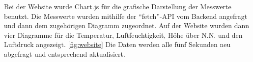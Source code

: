 Bei der Website wurde Chart.js für die grafische Darstellung der Messwerte benutzt.
Die Messwerte wurden mithilfe der "`fetch"'-API vom Backend angefragt und dann dem zugehörigen Diagramm zugeordnet.
Auf der Website wurden dann vier Diagramme für die Temperatur, Luftfeuchtigkeit, Höhe über N.N. und den Luftdruck angezeigt. \ref{fig:website}
Die Daten werden alle fünf Sekunden neu abgefragt und entsprechend aktualisiert.